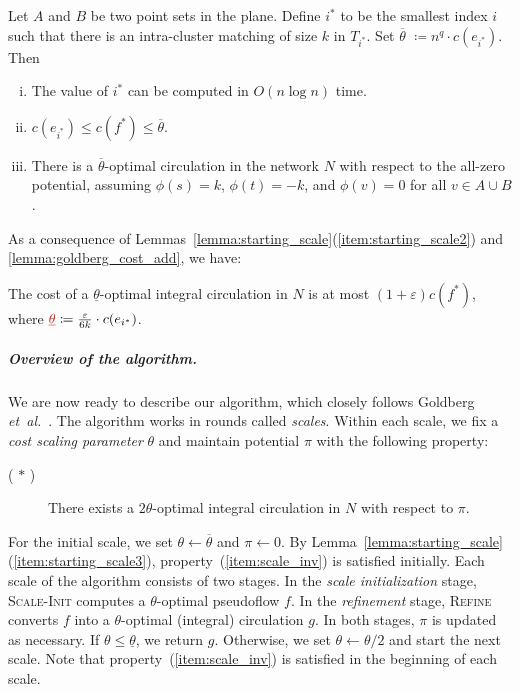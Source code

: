 \documentclass[a4paper,UKenglish,nolineno]{socg-lipics-v2019}
\makeatletter
\def\etal{\emph{et~al.}}
\def\etal{\textit{et~al.}}
\def\eps{\varepsilon}
\def\fsupply{\phi}
\def\cost{c}
\def\EMPH#1{\textcolor{BrickRed}{{\emph{#1}}}}
\def\namedlabel#1#2{\begingroup
    #2%
    \def\@currentlabel{#2}%
    \phantomsection\label{#1}\endgroup
}
\makeatother
\begin{document}
\begin{lemma}
\label{lemma:starting_scale}
Let $A$ and $B$ be two point sets in the plane.
Define \EMPH{$i^*$} to be the smallest index $i$ such that there is an
intra-cluster matching of size $k$ in $T_{i^*}$.
Set \EMPH{$\overline{\theta}$} $\coloneqq n^q \cdot c(e_{i^*})$.
Then
\begin{enumerate}[(i)]
\item \label{item:starting_scale1}
	The value of $i^*$ can be computed in $O(n\log n)$ time.
\item \label{item:starting_scale2}
	$c(e_{i^*}) \leq \cost(f^*) \leq \overline{\theta}$.
\item \label{item:starting_scale3}
	There is a $\overline{\theta}$-optimal circulation in the network $N$ with
	respect to the all-zero potential, assuming $\fsupply(s) = k$,
	$\fsupply(t) = -k$, and $\fsupply(v) = 0$ for all $v \in A \cup B$.
\end{enumerate}
\end{lemma}

As a consequence of Lemmas~\ref{lemma:starting_scale}(\ref{item:starting_scale2})
and \ref{lemma:goldberg_cost_add}, we have:
%
\begin{corollary}
\label{corollary:goldberg_approx}
The cost of a $\underline{\theta}$-optimal integral circulation in $N$ is at
most $(1+\eps) \cost(f^*)$,
where $\EMPH{$\underline{\theta}$} \coloneqq \frac{\eps}{6k} \cdot c(e_{i^*})$.
\end{corollary}

\subparagraph{Overview of the algorithm.}
We are now ready to describe our algorithm, which closely follows Goldberg \etal~\cite{GHKT17}.
The algorithm works in rounds called \EMPH{scales}.
Within each scale, we fix a \EMPH{cost scaling parameter}
\EMPH{$\theta$} and maintain potential $\pi$ with the following property:

\begin{description}
\item[(\namedlabel{item:scale_inv}{$\ast$})]
	There exists a $2\theta$-optimal integral circulation in $N$ with respect to $\pi$.
\end{description}

For the initial scale, we set $\theta \gets \overline{\theta}$ and $\pi \gets 0$.
By Lemma~\ref{lemma:starting_scale}(\ref{item:starting_scale3}),
property~(\ref{item:scale_inv}) is satisfied initially.
Each scale of the algorithm consists of two stages.
In the \EMPH{scale initialization} stage, \textsc{Scale-Init}
computes a $\theta$-optimal pseudoflow $f$.
In the \EMPH{refinement} stage, \textsc{Refine} converts $f$ into
a $\theta$-optimal (integral) circulation $g$.
In both stages, $\pi$ is updated as necessary.
If $\theta \leq \underline{\theta}$, we return $g$.
Otherwise, we set $\theta \gets \theta/2$ and start the next scale.
Note that property~(\ref{item:scale_inv}) is satisfied in the beginning of each scale.
\end{document}
